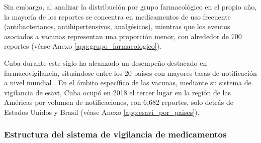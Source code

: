 

Sin embargo, al analizar la distribución por grupo farmacológico en el propio año, la mayoría de los reportes se concentra en medicamentos de uso frecuente (antibacterianos, antihipertensivos, analgésicos), mientras que los eventos asociados a vacunas representan una proporción menor, con alrededor de 700 reportes (véase Anexo \ref{app:grupo_farmacologico}).

Cuba durante este siglo ha alcanzado un desempeño destacado en farmacovigilancia, situándose entre los 20 países con mayores tasas de notificación a nivel mundial \cite{normas_farmacovigilancia_cuba_2012}. 
En el ámbito específico de las vacunas, mediante su sistema de vigilancia de \gls{esavi}, Cuba ocupó en 2018 el tercer lugar en la región de las Américas por volumen de notificaciones, con 6,682 reportes, solo detrás de Estados Unidos y Brasil \cite{ops_manual_esavi_2021} (véase Anexo \ref{app:esavi_por_paises}).


\subsubsection*{Estructura del sistema de vigilancia de medicamentos}




